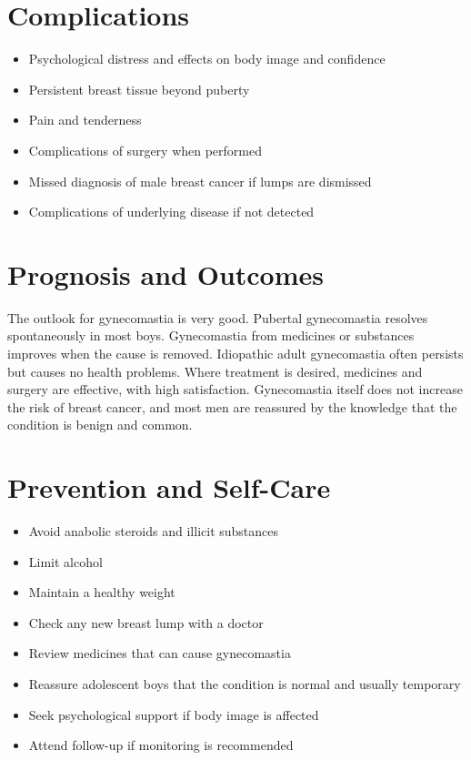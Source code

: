 \section*{Complications}
\begin{itemize}
    \item Psychological distress and effects on body image and confidence
    \item Persistent breast tissue beyond puberty
    \item Pain and tenderness
    \item Complications of surgery when performed
    \item Missed diagnosis of male breast cancer if lumps are dismissed
    \item Complications of underlying disease if not detected
\end{itemize}

\section*{Prognosis and Outcomes}
The outlook for gynecomastia is very good. Pubertal gynecomastia resolves spontaneously in most boys. Gynecomastia from medicines or substances improves when the cause is removed. Idiopathic adult gynecomastia often persists but causes no health problems. Where treatment is desired, medicines and surgery are effective, with high satisfaction. Gynecomastia itself does not increase the risk of breast cancer, and most men are reassured by the knowledge that the condition is benign and common.

\section*{Prevention and Self-Care}
\begin{itemize}
    \item Avoid anabolic steroids and illicit substances
    \item Limit alcohol
    \item Maintain a healthy weight
    \item Check any new breast lump with a doctor
    \item Review medicines that can cause gynecomastia
    \item Reassure adolescent boys that the condition is normal and usually temporary
    \item Seek psychological support if body image is affected
    \item Attend follow-up if monitoring is recommended
\end{itemize}

